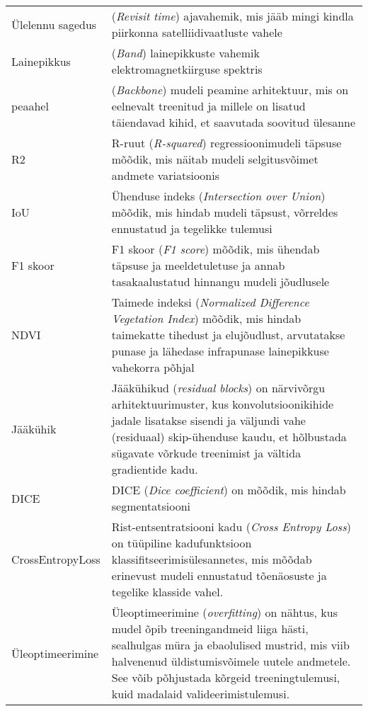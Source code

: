 \begin{longtable}{p{3cm}p{10cm}}  %
Ülelennu sagedus & (\textit{Revisit time}) ajavahemik, mis jääb mingi kindla
piirkonna satelliidivaatluste vahele\\
Lainepikkus & (\textit{Band}) lainepikkuste vahemik elektromagnetkiirguse spektris \\
peaahel & (\textit{Backbone}) mudeli peamine arhitektuur, mis on eelnevalt treenitud
ja millele on lisatud täiendavad kihid, et saavutada soovitud ülesanne\\
R2 & R-ruut (\textit{R-squared}) regressioonimudeli täpsuse mõõdik, mis näitab
mudeli selgitusvõimet andmete variatsioonis\\
IoU & Ühenduse indeks (\textit{Intersection over Union}) mõõdik, mis hindab
mudeli täpsust, võrreldes ennustatud ja tegelikke tulemusi\\
F1 skoor & F1 skoor (\textit{F1 score}) mõõdik, mis ühendab täpsuse ja
meeldetuletuse ja annab tasakaalustatud hinnangu mudeli jõudlusele\\
NDVI & Taimede indeksi (\textit{Normalized Difference Vegetation Index}) mõõdik, mis
hindab taimekatte tihedust ja elujõudlust, arvutatakse punase ja lähedase
infrapunase lainepikkuse vahekorra põhjal\\
Jääkühik & Jääkühikud (\textit{residual blocks}) on närvivõrgu arhitektuurimuster, kus konvolutsioonikihide jadale lisatakse sisendi ja väljundi vahe (residuaal) skip-ühenduse kaudu, et hõlbustada sügavate võrkude treenimist ja vältida gradientide kadu. \\
DICE & DICE (\textit{Dice coefficient}) on mõõdik, mis hindab segmentatsiooni \\
CrossEntropyLoss & Rist-entsentratsiooni kadu (\textit{Cross Entropy Loss}) on
tüüpiline kadufunktsioon klassifitseerimisülesannetes, mis mõõdab erinevust mudeli ennustatud tõenäosuste ja tegelike klasside vahel. \\
Üleoptimeerimine & Üleoptimeerimine (\textit{overfitting})  on nähtus, kus mudel õpib treeningandmeid liiga hästi, sealhulgas müra ja ebaolulised mustrid, mis viib halvenenud üldistumisvõimele uutele andmetele. See võib põhjustada kõrgeid treeningtulemusi, kuid madalaid valideerimistulemusi. \\
\end{longtable}
\addtocounter{table}{-1} %